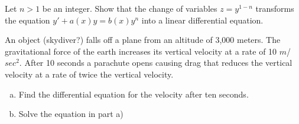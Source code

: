 \documentclass[12pt,letterpaper]{hmcpset}
\begin{document}
\begin{solution}
    \vfill
\end{solution}
\clearpage

\begin{problem}
    Let $n > 1$ be an integer. Show that the 
    change of variables $z = y^{1-n}$ transforms
    the equation $y' + a(x)y = b(x)y^n$
    into a linear differential equation.
\end{problem}

\begin{solution}
    \vfill
\end{solution}
\clearpage

\begin{problem}[7]
    An object (skydiver?) falls off a plane from an
    altitude of 3,000 meters. The gravitational
    force of the earth increases its vertical 
    velocity at a rate of 10 $m$/$sec^2$. After 10 
    seconds a parachute opens causing drag that reduces
    the vertical velocity at a rate of twice the vertical
    velocity.
    \begin{enumerate}[a)]
        \item Find the differential equation for the
            velocity after ten seconds.
        \item Solve the equation in part a)
    \end{enumerate}
\end{problem}

\begin{solution}
    \vfill
\end{solution}
\clearpage
\end{document}

